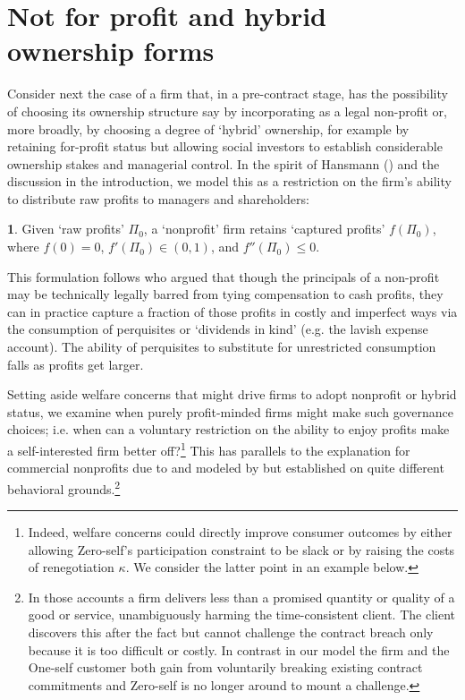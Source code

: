 \documentclass[11pt,english]{article}
\theoremstyle{plain}
\theoremstyle{definition}
\newtheorem*{defn*}{\protect\definitionname}
\providecommand{\definitionname}{Definition}
\begin{document}
\section{Not for profit and hybrid ownership forms}\label{nonprofits}

Consider next the case of a firm that, in a pre-contract stage, has
the possibility of choosing its ownership structure say by incorporating
as a legal non-profit or, more broadly, by choosing a degree of `hybrid'
ownership, for example by retaining for-profit status but allowing
social investors to establish considerable ownership stakes and managerial
control. In the spirit of Hansmann () and the discussion in the introduction,
we model this as a restriction on the firm's ability to distribute
raw profits to managers and shareholders:
\begin{defn*}
Given `raw profits' $\Pi_{0}$, a `nonprofit' firm retains `captured
profits' $f\left(\Pi_{0}\right)$, where $f\left(0\right)=0$, $f'\left(\Pi_{0}\right)\in\left(0,1\right)$,
and $f''\left(\Pi_{0}\right)\leq0.$ 
\end{defn*}
This formulation follows \citet{glaeser2001} who
argued that though the principals of a non-profit may be technically
legally barred from tying compensation to cash profits, they can in
practice capture a fraction of those profits in costly and imperfect
ways via the consumption of perquisites or `dividends in kind' (e.g.
the lavish expense account). The ability of perquisites to substitute
for unrestricted consumption falls as profits get larger. 

Setting aside welfare concerns that might drive firms to adopt nonprofit
or hybrid status, we examine when purely profit-minded firms might
make such governance choices; i.e. when can a voluntary restriction
on the ability to enjoy profits make a self-interested firm better
off?\footnote{Indeed, welfare concerns could directly improve consumer outcomes
by either allowing Zero-self's participation constraint to be slack
or by raising the costs of renegotiation $\kappa$. We consider the
latter point in an example below.} This has parallels to the explanation for commercial nonprofits due
to \cite{hansmann1996} and  modeled by \citet{glaeser2001} but established
on quite different behavioral grounds.\footnote{In those accounts a firm delivers less than a promised
quantity or quality of a good or service, unambiguously harming the
time-consistent client. The client discovers this
after the fact but cannot challenge the contract breach only because it is too difficult or costly. In
contrast in our model  the firm and the One-self customer both
gain from voluntarily breaking existing contract commitments and
Zero-self is no longer around to mount a challenge.} 
\end{document}

